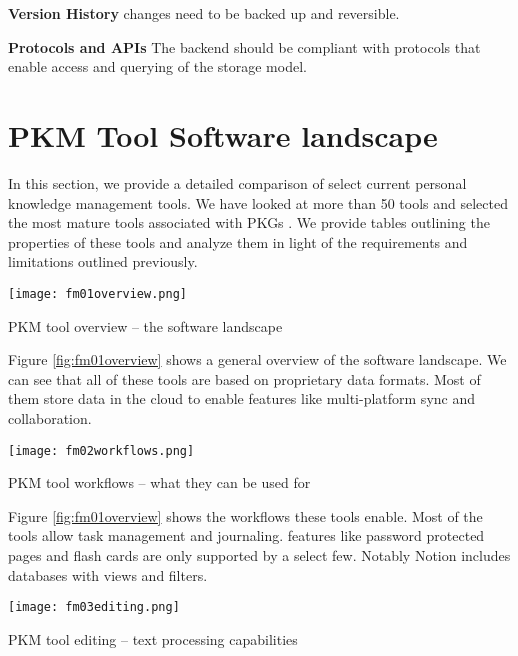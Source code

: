 \textbf{Version History} changes need to be backed up and reversible.

\textbf{Protocols and APIs} The backend should be compliant with protocols that enable access and querying of the storage model.







\section{PKM Tool Software landscape}

In this section, we provide a detailed comparison of select current personal knowledge management tools. We have looked at more than 50 tools and selected the most mature tools associated with PKGs \cite{notion, obsidian, roam, logseq, remnote}. We provide tables outlining the properties of these tools and analyze them in light of the requirements and limitations outlined previously.

\begin{table}[H]
    \centering
    \texttt{[image: fm01overview.png]}
    \caption{PKM tool overview -- the software landscape}
    \label{fig:fm01overview}
\end{table}

Figure \ref{fig:fm01overview} shows a general overview of the software landscape. We can see that all of these tools are based on proprietary data formats. Most of them store data in the cloud to enable features like multi-platform sync and collaboration.


\begin{table}[H]
    \centering
    \texttt{[image: fm02workflows.png]}
    \caption{PKM tool workflows -- what they can be used for}
    \label{fig:fm02workflows}
\end{table}

Figure \ref{fig:fm01overview} shows the workflows these tools enable. Most of the tools allow task management and journaling. features like password protected pages and flash cards are only supported by a select few. Notably Notion includes databases with views and filters.


\begin{table}[H]
    \centering
    \texttt{[image: fm03editing.png]}
    \caption{PKM tool editing -- text processing capabilities}
    \label{fig:fm03editing}
\end{table}


